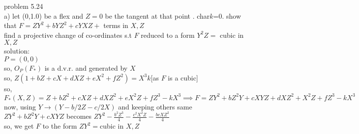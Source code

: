 \documentclass[11pt]{article}
\begin{document}
problem 5.24\\
a) let (0,1.0) be a flex and $Z=0$ be the tangent at that point . char$k$=0.
show that $F=ZY^2+bYZ^2+cYXZ+$ terms in $X,Z$\\
find a projective change of co-ordinates  s.t $F$ reduced to a form $Y^2Z=$ cubic in $X,Z$\\
solution:\\
$P=(0,0)$\\
so, $O_P(F_*)$ is a d.v.r. and generated by $X$\\
so, $Z(1+bZ+cX+dXZ+eX^2+fZ^2)=X^3k$[as $F$ is a cubic]\\
so, $F_*(X,Z)=Z+bZ^2+cXZ+dXZ^2+eX^2Z+fZ^3-kX^3\implies F=ZY^2+bZ^2Y+cXYZ+dXZ^2+X^2Z+fZ^3-kX^3$\\
now,  using $Y\to (Y-b/2Z-c/2X)$  and keeping others same\\
$ ZY^2+bZ^2Y+cXYZ$ becomes $ZY^2-\frac{b^2Z^3}{4}-\frac{c^2X^2Z}{4}-\frac{bcXZ^2}{4}$ \\
so, we get $F$ to the form $ZY^2=$cubic in $X,Z$\\
\end{document}
